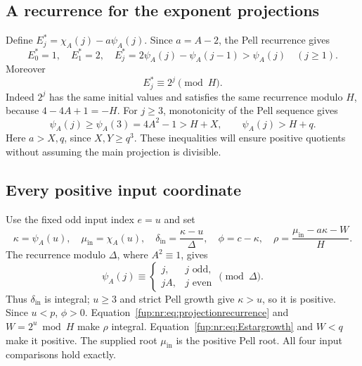 \documentclass[11pt,letterpaper]{article}
\theoremstyle{definition}\newtheorem{definition}[theorem]{Definition}
\theoremstyle{remark}\newtheorem{remark}[theorem]{Remark}
\begin{document}
\subsection{A recurrence for the exponent projections}\label{fup:nr:sec:Estar}
Define $E_j^*=\chi_A(j)-a\psi_A(j)$. Since $a=A-2$, the Pell recurrence gives
\begin{equation}\label{fup:nr:eq:Estar}
 E_0^*=1,\quad E_1^*=2,\quad
 E_j^*=2\psi_A(j)-\psi_A(j-1)>\psi_A(j)\quad(j\ge1).
\end{equation}
Moreover
\begin{equation}\label{fup:nr:eq:projectionrecurrence}
 E_j^*\equiv2^j\pmod H.
\end{equation}
Indeed $2^j$ has the same initial values and satisfies the same recurrence modulo $H$, because $4-4A+1=-H$. For $j\ge3$, monotonicity of the Pell sequence gives
\begin{equation}\label{fup:nr:eq:Estargrowth}
 \psi_A(j)\ge\psi_A(3)=4A^2-1>H+X,
 \qquad \psi_A(j)>H+q.
\end{equation}
Here $a>X,q$, since $X,Y\ge q^3$. These inequalities will ensure positive quotients without assuming the main projection is divisible.

\subsection{Every positive input coordinate}
Use the fixed odd input index $e=u$ and set
\begin{equation}\label{fup:nr:eq:inputwitness}
 \kappa=\psi_A(u),\quad\mu_{\mathrm{in}}=\chi_A(u),\quad
 \delta_{\mathrm{in}}=\frac{\kappa-u}{\Delta},\quad
 \phi=c-\kappa,\quad
 \rho=\frac{\mu_{\mathrm{in}}-a\kappa-W}{H}.
\end{equation}
The recurrence modulo $\Delta$, where $A^2\equiv1$, gives
\[
 \psi_A(j)\equiv
 \begin{cases}j,&j\text{ odd},\\jA,&j\text{ even}\end{cases}
 \pmod\Delta.
\]
Thus $\delta_{\mathrm{in}}$ is integral; $u\ge3$ and strict Pell growth give $\kappa>u$, so it is positive. Since $u<p$, $\phi>0$. Equation~\eqref{fup:nr:eq:projectionrecurrence} and $W=2^u\bmod H$ make $\rho$ integral. Equation~\eqref{fup:nr:eq:Estargrowth} and $W<q$ make it positive. The supplied root $\mu_{\mathrm{in}}$ is the positive Pell root. All four input comparisons hold exactly.
\end{document}
